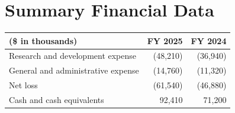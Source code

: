 \section{Summary Financial Data}
\begin{tabularx}{\linewidth}{@{}X R R@{}}
\toprule
\textbf{(\$ in thousands)} & \textbf{FY 2025} & \textbf{FY 2024}\\
\midrule
Research and development expense & (48,210) & (36,940)\\
General and administrative expense & (14,760) & (11,320)\\
Net loss & (61,540) & (46,880)\\
Cash and cash equivalents & 92,410 & 71,200\\
\bottomrule
\end{tabularx}
